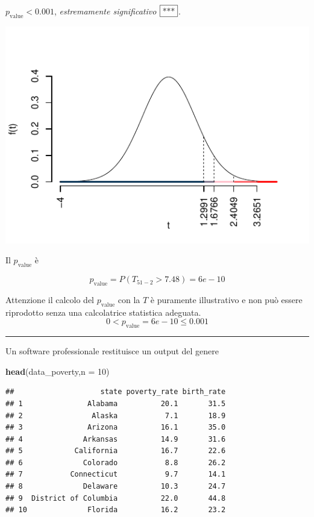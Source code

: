 \documentclass[
  11pt,
]{book}
\newenvironment{Shaded}{\begin{snugshade}}{\end{snugshade}}
\newcommand{\AttributeTok}[1]{\textcolor[rgb]{0.13,0.29,0.53}{#1}}
\newcommand{\DecValTok}[1]{\textcolor[rgb]{0.00,0.00,0.81}{#1}}
\newcommand{\FunctionTok}[1]{\textcolor[rgb]{0.13,0.29,0.53}{\textbf{#1}}}
\newcommand{\NormalTok}[1]{#1}
\theoremstyle{mytheoremstyle}
\theoremstyle{mydefstyle}
\newenvironment{sol}
  {
  \begin{tcolorbox}[enhanced,breakable,arc=0.1mm,boxrule=1pt,colback=white,colframe=iblue,
  title=\bf \fontfamily{lmss}\selectfont \hspace{.5 cm} Soluzione,drop fuzzy shadow]

}{
\end{tcolorbox}
  }
\begin{document}
\begin{sol}
\(p_\text{value}<0.001\), \emph{estremamente significativo} \(\fbox{***}\).

\begin{center}\includegraphics{Esami_passati_con_soluzioni_files/figure-latex/06-regr-4,-1} \end{center}

Il \(p_{\text{value}}\) è

\[ p_{\text{value}} = P(T_{51-2}>7.48)=6e-10 \]

Attenzione il calcolo del \(p_\text{value}\) con la \(T\) è puramente illustrativo e non può essere riprodotto senza una calcolatrice statistica adeguata.\[
 0 < p_\text{value}= 6e-10 \leq 0.001 
\]

\end{sol}

\begin{center}\rule{0.5\linewidth}{0.5pt}\end{center}

Un software professionale restituisce un output del genere

\begin{Shaded}
\begin{Highlighting}[]
\FunctionTok{head}\NormalTok{(data\_poverty,}\AttributeTok{n =} \DecValTok{10}\NormalTok{)}
\end{Highlighting}
\end{Shaded}

\begin{verbatim}
##                    state poverty_rate birth_rate
## 1               Alabama          20.1       31.5
## 2                Alaska           7.1       18.9
## 3               Arizona          16.1       35.0
## 4              Arkansas          14.9       31.6
## 5            California          16.7       22.6
## 6              Colorado           8.8       26.2
## 7           Connecticut           9.7       14.1
## 8              Delaware          10.3       24.7
## 9  District of Columbia          22.0       44.8
## 10              Florida          16.2       23.2
\end{verbatim}
\end{document}
